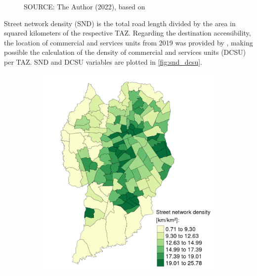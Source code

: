 \begin{figure}[!htbp]
\begin{subfigure}{0.5\textwidth}
    \end{subfigure}
    \label{fig:tsd_par}
    \par SOURCE: The Author (2022), based on \textcite{IPPUC2018b,IPPUC2021}
\end{figure}

Street network density (SND) is the total road length divided by the area in squared kilometers of the respective TAZ. Regarding the destination accessibility, the location of commercial and services units from 2019 was provided by \textcite{IPPUC2021}, making possible the calculation of the density of commercial and services units (DCSU) per TAZ. SND and DCSU variables are plotted in \autoref{fig:snd_dcsu}.

\begin{figure}[!htbp]
    \centering\footnotesize
    \captionsetup{font=footnotesize}
    \caption{SND AND DCSU}
    \begin{subfigure}{0.5\textwidth}
        \includegraphics{fig/map_SND.png}
    \end{subfigure}%
    \begin{subfigure}{0.5\textwidth}

\end{subfigure}
\end{figure}
